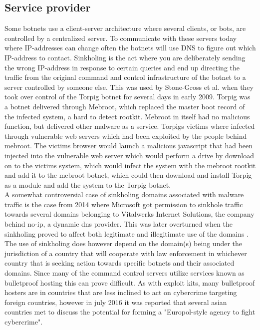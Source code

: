 \subsection{Service provider}
Some botnets use a client-server architecture where several clients, or bots, are controlled by a centralized server. To communicate with these servers today where IP-addresses can change often the botnets will use DNS to figure out which IP-address to contact. Sinkholing is the act where you are deliberately sending the wrong IP-address in response to certain queries and end up directing the traffic from the original command and control infrastructure of the botnet to a server controlled by someone else.
This was used by Stone-Gross et al. \cite{jan_stone-gross} when they took over control of the Torpig botnet for several days in early 2009. Torpig was a botnet delivered through Mebroot, which replaced the master boot record of the infected system, a hard to detect rootkit. Mebroot in itself had no malicious function, but delivered other malware as a service. Torpigs victims where infected  through vulnerable web servers which had been exploited by the people behind mebroot. The victims browser would launch a malicious javascript that had been injected into the vulnerable web server which would perform a drive by download on to the victims system, which would infect the system with the mebroot rootkit and add it to the mebroot botnet, which could then download and install Torpig as a module and add the system to the Torpig botnet. \\


A somewhat controversial case of sinkholing domains associated with malware traffic is the case from 2014 where Microsoft got permission to sinkhole traffic towards several domains belonging to Vitalwerks Internet Solutions, the company behind no-ip, a dynamic dns provider. This was later overturned when the sinkholing proved to affect both legitimate and illegitimate use of the domains \cite{jan-microsoft-no-ip}. 
The use of sinkholing does however depend on the domain(s) being under the jurisdiction of a country that will cooperate with law enforcement in whichever country that is seeking action towards specific botnets and their associated domains. Since many of the command control servers utilize services known as bulletproof hosting this can prove difficult. As with exploit kits, many bulletproof hosters are in countries that are less inclined to act on cybercrime targeting foreign countries, however in july 2016 it was reported that several asian countries met to discuss the potential for forming a "Europol-style agency to fight cybercrime"\cite{jan-asia-europol}.

